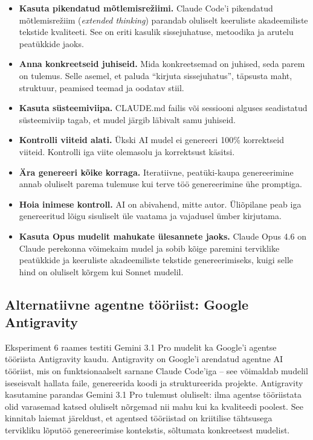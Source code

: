 \begin{itemize}
    \item \textbf{Kasuta pikendatud mõtlemisrežiimi.} Claude Code'i pikendatud mõtlemisrežiim (\textit{extended thinking}) parandab oluliselt keeruliste akadeemiliste tekstide kvaliteeti. See on eriti kasulik sissejuhatuse, metoodika ja arutelu peatükkide jaoks.
    \item \textbf{Anna konkreetseid juhiseid.} Mida konkreetsemad on juhised, seda parem on tulemus. Selle asemel, et paluda ``kirjuta sissejuhatus'', täpsusta maht, struktuur, peamised teemad ja oodatav stiil.
    \item \textbf{Kasuta süsteemiviipa.} CLAUDE.md failis või sessiooni alguses seadistatud süsteemiviip tagab, et mudel järgib läbivalt samu juhiseid.
    \item \textbf{Kontrolli viiteid alati.} Ükski AI mudel ei genereeri 100\% korrektseid viiteid. Kontrolli iga viite olemasolu ja korrektsust käsitsi.
    \item \textbf{Ära genereeri kõike korraga.} Iteratiivne, peatüki-kaupa genereerimine annab oluliselt parema tulemuse kui terve töö genereerimine ühe promptiga.
    \item \textbf{Hoia inimese kontroll.} AI on abivahend, mitte autor. Üliõpilane peab iga genereeritud lõigu sisuliselt üle vaatama ja vajadusel ümber kirjutama.
    \item \textbf{Kasuta Opus mudelit mahukate ülesannete jaoks.} Claude Opus 4.6 on Claude perekonna võimekaim mudel ja sobib kõige paremini terviklike peatükkide ja keeruliste akadeemiliste tekstide genereerimiseks, kuigi selle hind on oluliselt kõrgem kui Sonnet mudelil.
\end{itemize}

\subsection{Alternatiivne agentne tööriist: Google Antigravity} \label{subsec:antigravity}

Eksperiment 6 raames testiti Gemini 3.1 Pro mudelit ka Google'i agentse tööriista Antigravity kaudu. Antigravity on Google'i arendatud agentne AI tööriist, mis on funktsionaalselt sarnane Claude Code'iga -- see võimaldab mudelil iseseisvalt hallata faile, genereerida koodi ja struktureerida projekte. Antigravity kasutamine parandas Gemini 3.1 Pro tulemust oluliselt: ilma agentse tööriistata olid varasemad katsed oluliselt nõrgemad nii mahu kui ka kvaliteedi poolest. See kinnitab laiemat järeldust, et agentsed tööriistad on kriitilise tähtsusega tervikliku lõputöö genereerimise kontekstis, sõltumata konkreetsest mudelist.

